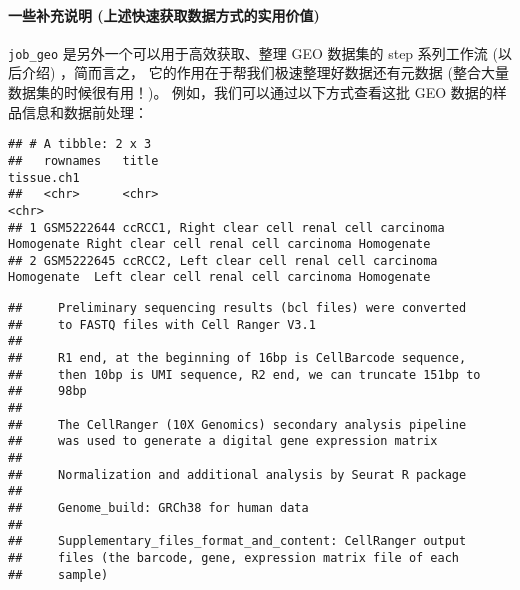 \documentclass[
]{article}
\newenvironment{Shaded}{\begin{snugshade}}{\end{snugshade}}
\newcommand{\NormalTok}[1]{#1}
\newcommand{\OperatorTok}[1]{\textcolor[rgb]{0.81,0.36,0.00}{\textbf{#1}}}
\begin{document}
\hypertarget{ux4e00ux4e9bux8865ux5145ux8bf4ux660e-ux4e0aux8ff0ux5febux901fux83b7ux53d6ux6570ux636eux65b9ux5f0fux7684ux5b9eux7528ux4ef7ux503c}{%
\paragraph{一些补充说明 (上述快速获取数据方式的实用价值)}\label{ux4e00ux4e9bux8865ux5145ux8bf4ux660e-ux4e0aux8ff0ux5febux901fux83b7ux53d6ux6570ux636eux65b9ux5f0fux7684ux5b9eux7528ux4ef7ux503c}}

\texttt{job\_geo} 是另外一个可以用于高效获取、整理 GEO 数据集的 step 系列工作流 (以后介绍) ，简而言之，
它的作用在于帮我们极速整理好数据还有元数据 (整合大量数据集的时候很有用！)。
例如，我们可以通过以下方式查看这批 GEO 数据的样品信息和数据前处理：

\begin{Shaded}
\end{Shaded}

\begin{verbatim}
## # A tibble: 2 x 3
##   rownames   title                                                    tissue.ch1                                      
##   <chr>      <chr>                                                    <chr>                                           
## 1 GSM5222644 ccRCC1, Right clear cell renal cell carcinoma Homogenate Right clear cell renal cell carcinoma Homogenate
## 2 GSM5222645 ccRCC2, Left clear cell renal cell carcinoma Homogenate  Left clear cell renal cell carcinoma Homogenate
\end{verbatim}

\begin{Shaded}
\end{Shaded}

\begin{verbatim}
##     Preliminary sequencing results (bcl files) were converted
##     to FASTQ files with Cell Ranger V3.1
## 
##     R1 end, at the beginning of 16bp is CellBarcode sequence,
##     then 10bp is UMI sequence, R2 end, we can truncate 151bp to
##     98bp
## 
##     The CellRanger (10X Genomics) secondary analysis pipeline
##     was used to generate a digital gene expression matrix
## 
##     Normalization and additional analysis by Seurat R package
## 
##     Genome_build: GRCh38 for human data
## 
##     Supplementary_files_format_and_content: CellRanger output
##     files (the barcode, gene, expression matrix file of each
##     sample)
\end{verbatim}
\end{document}
